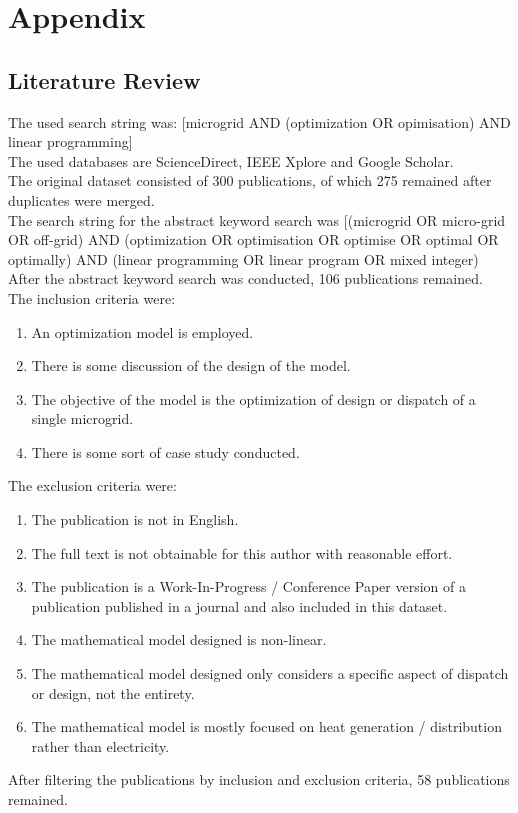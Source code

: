\documentclass[
	11pt,								%
	DIV10,								%
	a4paper,         					%
	oneside,							%
	headheight=20pt,					%
	footheight=20pt,					%
    parskip=full,						%
    listof=totoc,						%
	bibliography=totoc,					%
	index=totoc,						%
]{scrartcl}
\begin{document}
\section{Appendix}
\subsection{Literature Review}
The used search string was:  [microgrid AND (optimization OR opimisation) AND linear programming]
\\
The used databases are ScienceDirect, IEEE Xplore and Google Scholar.
\\
The original dataset consisted of 300 publications, of which 275 remained after duplicates were merged.
\\
The search string for the abstract keyword search was [(microgrid OR micro-grid OR off-grid) AND (optimization OR optimisation OR optimise OR optimal OR optimally) AND (linear programming OR linear program OR mixed integer)
\\
After the abstract keyword search was conducted, 106 publications remained.
\\
The inclusion criteria were:
\begin{enumerate}
	\item An optimization model is employed.
	\item There is some discussion of the design of the model.
	\item The objective of the model is the optimization of design or dispatch of a single microgrid.
	\item There is some sort of case study conducted.
\end{enumerate}
The exclusion criteria were:
\begin{enumerate}
	\item The publication is not in English.
	\item The full text is not obtainable for this author with reasonable effort.
	\item The publication is a Work-In-Progress / Conference Paper version of a publication published in a journal and also included in this dataset.
	\item The mathematical model designed is non-linear.
	\item The mathematical model designed only considers a specific aspect of dispatch or design, not the entirety.
	\item The mathematical model is mostly focused on heat generation / distribution rather than electricity.
\end{enumerate}
After filtering the publications by inclusion and exclusion criteria, 58 publications remained.


\newpage								%
\renewcommand\refname{Literature}			%
\printbibliography
\end{document}
